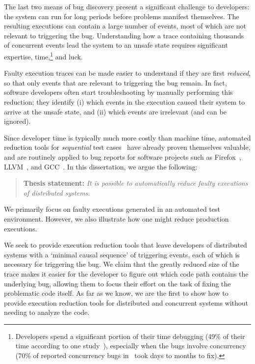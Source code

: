 The last two means of bug discovery present a significant challenge to
developers: the system can run for
long periods before problems manifest themselves. The resulting executions
can contain a large number of events, most of which are not relevant to triggering the
bug. Understanding how a trace containing thousands of concurrent events lead
the system to an unsafe state requires significant expertise, time,\footnote{Developers spend a significant portion of their time
debugging (49\% of their time according to one
study~\cite{LaToza:2006:MMM:1134285.1134355}), especially when the bugs
involve concurrency (70\% of reported concurrency bugs
in~\cite{msoft_concurrency} took days to months to fix).}
and luck.


Faulty execution traces can be made %
easier to understand if they are first
{\em reduced}, so that only events that are relevant to triggering the bug remain.
In fact, software developers often start troubleshooting by manually performing this
reduction; they identify
(i) which events in the execution caused their system to arrive at the unsafe
state, and (ii) which events are irrelevant (and can be ignored).

Since developer time is typically much more costly than machine time,
automated reduction tools for {\em sequential}
test
cases~\cite{claessen2000quickcheck,Zeller:2002:SIF:506201.506206,yang2011finding}
have already proven themselves valuable,
and are routinely applied to bug reports for software projects such as Firefox~\cite{firefox_reduction}, LLVM~\cite{bugpoint}, and GCC~\cite{gcc_reduction}.
In this dissertation, we argue the following:

\begin{quote}
{\textbf{Thesis statement:}} \textit{It is possible to automatically reduce faulty
executions of distributed systems.}
\end{quote}

\noindent We primarily
focus on faulty executions generated in an automated test environment. However, we also
illustrate how one might reduce production executions.

We seek to provide execution reduction tools that leave developers of
distributed systems with a `minimal causal sequence' of triggering events, each of which is necessary for triggering the bug.
We claim that the greatly reduced size of the trace makes it easier for the developer to figure out which code path contains the underlying bug, allowing them to focus their effort on the task of fixing the problematic code itself.
As far as we know, we are the first to show how to provide execution
reduction tools
for distributed and concurrent systems without needing to analyze the code.


